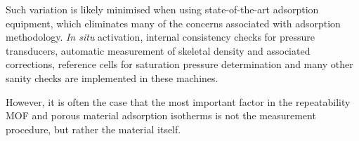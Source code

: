 Such variation is likely minimised when using state-of-the-art 
adsorption equipment, which eliminates many of the concerns
associated with adsorption methodology. \textit{In situ}
activation, internal consistency checks for pressure transducers,
automatic measurement of skeletal density and associated 
corrections, reference cells for saturation pressure determination
and many other sanity checks are implemented in these machines.

However, it is often the case that the most important factor
in the repeatability MOF and porous material adsorption isotherms 
is not the measurement procedure, but rather the material itself.

